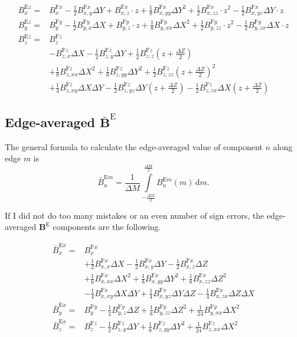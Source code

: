\documentclass[a4paper,10pt]{article}
\newcommand{\Be}{\mathbf{B}^\mathrm{E}}
\newcommand{\Bez}{B^{\mathrm{E}z}}
\newcommand{\avBe}{\bar{\mathbf{B}}^\mathrm{E}}
\newcommand{\avBex}{\bar{B}^{\mathrm{E}x}}
\newcommand{\Bfx}{B^{\mathrm{F}x}}
\newcommand{\Bfy}{B^{\mathrm{F}y}}
\newcommand{\Bfz}{B^{\mathrm{F}z}}
\newcommand{\pp}[1]{\left(#1\right)}
\newcommand{\DX}{\Delta X}
\newcommand{\DY}{\Delta Y}
\newcommand{\DZ}{\Delta Z}
\begin{document}
\begin{align}
\Bez_x = &\Bfx_x -
\frac{1}{2}\Bfx_{x,y}\DY +
\Bfx_{x,z}\cdot z +
\frac{1}{8}\Bfx_{x,yy}\DY^2 +
\frac{1}{2}\Bfx_{x,zz}\cdot z^2 -
\frac{1}{2}\Bfx_{x,yz}\DY\cdot z
\\
\Bez_y =& \Bfy_y -
\frac{1}{2}\Bfy_{y,x}\DX +
\Bfy_{y,z}\cdot z +
\frac{1}{8}\Bfy_{y,xx}\DX^2 +
\frac{1}{2}\Bfy_{y,zz}\cdot z^2 -
\frac{1}{2}\Bfy_{y,zx}\DX\cdot z
\\
\Bez_z = &\Bfz_z \nonumber
\\ &-
\Bfz_{z,x}\DX -
\frac{1}{2}\Bfz_{z,y}\DY +
\frac{1}{2}\Bfz_{z,z}\pp{z + \frac{\DZ}{2}} \nonumber
\\ &+
\frac{1}{8}\Bfz_{z,xx}\DX^2 +
\frac{1}{8}\Bfz_{z,yy}\DY^2 +
\frac{1}{2}\Bfz_{z,zz}\pp{z+\frac{\DZ}{2}}^2 \nonumber
\\ &+
\frac{1}{4}\Bfz_{z,xy}\DX\DY -
\frac{1}{2}\Bfz_{z,yz}\DY\pp{z + \frac{\DZ}{2}} -
\frac{1}{2}\Bfz_{z,zx}\DX\pp{z + \frac{\DZ}{2}}
\end{align}


\subsection{Edge-averaged $\avBe$}
The general formula to calculate the edge-averaged value of component $n$
along edge $m$ is
\begin{equation}
\bar{B}^{\mathrm{E}m}_n = \frac{1}{\Delta M}
\int\limits_{-\frac{\Delta M}{2}}^{\frac{\Delta M}{2}}\!
B^{\mathrm{E}m}_n\pp{m}\,\mathrm{d}m.
\end{equation}

If I did not do too many mistakes or an even number of sign errors, the
edge-averaged $\Be$ components are the following.

\begin{align}
\avBex_x = &\Bfx_x \nonumber
\\ &+
\frac{1}{2}\Bfx_{x,x}\DX -
\frac{1}{2}\Bfx_{x,y}\DY -
\frac{1}{2}\Bfx_{x,z}\DZ \nonumber
\\ &+
\frac{1}{6}\Bfx_{x,xx}\DX^2 +
\frac{1}{8}\Bfx_{x,yy}\DY^2 +
\frac{1}{8}\Bfx_{x,zz}\DZ^2 \nonumber
\\ &-
\frac{1}{4}\Bfx_{x,xy}\DX\DY +
\frac{1}{4}\Bfx_{x,yz}\DY\DZ -
\frac{1}{4}\Bfx_{x,zx}\DZ\DX
\\
\avBex_y = &\Bfy_y -
\frac{1}{2}\Bfy_{y,z}\DZ +
\frac{1}{8}\Bfy_{y,zz}\DZ^2 +
\frac{1}{24}\Bfy_{y,xx}\DX^2
\\
\avBex_z = &\Bfz_z -
\frac{1}{2}\Bfz_{z,y}\DY +
\frac{1}{8}\Bfz_{z,yy}\DY^2 +
\frac{1}{24}\Bfz_{z,xx}\DX^2
\end{align}
\end{document}
